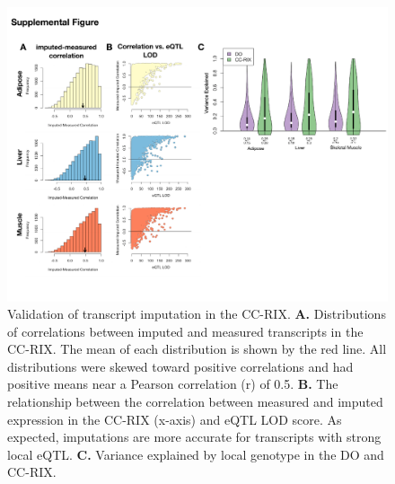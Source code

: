 \documentclass[
]{article}
\begin{document}
\begin{figure}[ht!]
\includegraphics[width=\textwidth]{Figures/Supp_Fig_CC-RIX_Imputation.pdf} 
\caption{Validation of transcript imputation in the CC-RIX. \textbf{A.} 
Distributions of correlations between imputed and measured transcripts 
in the CC-RIX. The mean of each distribution is shown by the red line. 
All distributions were skewed toward positive correlations and had
 positive means near a Pearson correlation (r) of 0.5. \textbf{B.} 
 The relationship between the correlation between measured and 
 imputed expression in the CC-RIX (x-axis) and eQTL LOD score. As 
 expected, imputations are more accurate for transcripts with strong 
 local eQTL. \textbf{C.} Variance explained by local genotype in the 
 DO and CC-RIX. 
}
\label{fig:cc_imputation}
\end{figure}

\pagebreak



\end{document}
